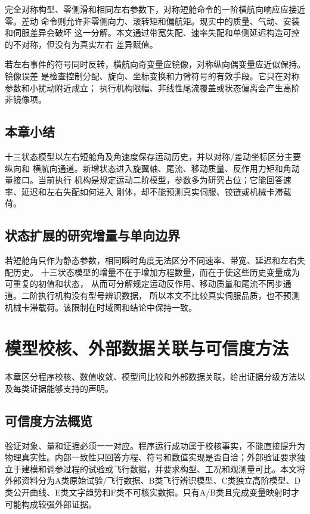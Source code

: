 \documentclass[UTF8,12pt,oneside,openany,fontset=windows]{ctexbook}
\begin{document}
完全对称构型、零侧滑和相同左右参数下，对称短舱命令的一阶横航向响应应接近零。差动 命令则允许非零侧向力、滚转矩和偏航矩。现实中的质量、气动、安装和伺服差异会破坏 这一分解。本文通过带宽失配、速率失配和单侧延迟构造可控的不对称，但没有为真实左右 差异赋值。

若左右事件的符号同时反转，横航向奇变量应镜像，对称纵向偶变量应近似保持。镜像误差 是检查控制分配、旋向、坐标变换和力臂符号的有效手段。它只在对称参数和小扰动附近成立； 执行机构限幅、非线性尾流覆盖或状态偏离会产生高阶非镜像项。

\section{本章小结}

十三状态模型以左右短舱角及角速度保存运动历史，并以对称/差动坐标区分主要纵向和 横航向通道。新增状态进入旋翼轴、尾流、移动质量、反作用力矩和角动量接口。当前执行 机构是规定运动二阶模型，参数多为研究占位；它能回答速率、延迟和左右失配如何进入 刚体，却不能预测真实伺服、铰链或机械卡滞载荷。

\section{状态扩展的研究增量与单向边界}

若短舱角只作为静态参数，相同瞬时角度无法区分不同速率、带宽、延迟和左右失配历史。 十三状态模型的增量不在于增加方程数量，而在于使这些历史变量成为可重复的初值和状态， 从而可分解规定运动反作用、移动质量和尾流不同步通道。二阶执行机构没有型号辨识数据， 所以本文不比较真实伺服品质，也不预测机械卡滞载荷。该限制在时域图和结论中保持一致。

\chapter{模型校核、外部数据关联与可信度方法}

本章区分程序校核、数值收敛、模型间比较和外部数据关联，给出证据分级方法以及每类证据能够支持的声明。

\section{可信度方法概览}

验证对象、量和证据必须一一对应。程序运行成功属于校核事实，不能直接提升为物理真实性。内部一致性只回答方程、符号和数值实现是否自洽；外部验证要求独立于建模和调参过程的试验或飞行数据，并要求构型、工况和观测量可比。本文将外部资料分为A类原始试验/飞行数据、B类飞行辨识模型、C类独立高阶模型、D类公开曲线、E类文字趋势和F类不可核实数据。只有A/B类且完成变量映射时才可能构成较强外部证据。
\end{document}
